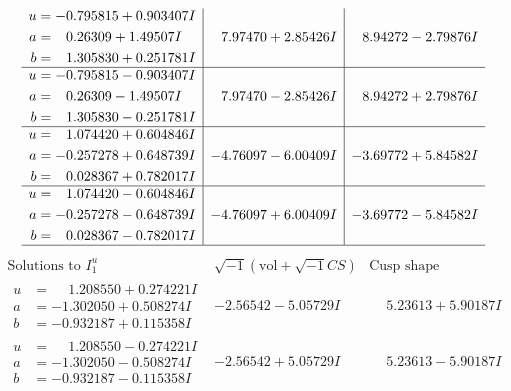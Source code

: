 \documentclass[1p]{elsarticle_modified}
\theoremstyle{definition}
\newcommand{\I}{\sqrt{-1}}
\begin{document}
$$\begin{array}{c|c|c}
\begin{aligned}
u &= -0.795815 + 0.903407 I \\
a &= \phantom{-}0.26309 + 1.49507 I \\
b &= \phantom{-}1.305830 + 0.251781 I\end{aligned}
 & \phantom{-}7.97470 + 2.85426 I & \phantom{-}8.94272 - 2.79876 I \\ \hline\begin{aligned}
u &= -0.795815 - 0.903407 I \\
a &= \phantom{-}0.26309 - 1.49507 I \\
b &= \phantom{-}1.305830 - 0.251781 I\end{aligned}
 & \phantom{-}7.97470 - 2.85426 I & \phantom{-}8.94272 + 2.79876 I \\ \hline\begin{aligned}
u &= \phantom{-}1.074420 + 0.604846 I \\
a &= -0.257278 + 0.648739 I \\
b &= \phantom{-}0.028367 + 0.782017 I\end{aligned}
 & -4.76097 - 6.00409 I & -3.69772 + 5.84582 I \\ \hline\begin{aligned}
u &= \phantom{-}1.074420 - 0.604846 I \\
a &= -0.257278 - 0.648739 I \\
b &= \phantom{-}0.028367 - 0.782017 I\end{aligned}
 & -4.76097 + 6.00409 I & -3.69772 - 5.84582 I\\
 \hline 
 \end{array}$$\newpage$$\begin{array}{c|c|c}  
\text{Solutions to }I^u_{1}& \I (\text{vol} + \sqrt{-1}CS) & \text{Cusp shape}\\
 \hline 
\begin{aligned}
u &= \phantom{-}1.208550 + 0.274221 I \\
a &= -1.302050 + 0.508274 I \\
b &= -0.932187 + 0.115358 I\end{aligned}
 & -2.56542 - 5.05729 I & \phantom{-}5.23613 + 5.90187 I \\ \hline\begin{aligned}
u &= \phantom{-}1.208550 - 0.274221 I \\
a &= -1.302050 - 0.508274 I \\
b &= -0.932187 - 0.115358 I\end{aligned}
 & -2.56542 + 5.05729 I & \phantom{-}5.23613 - 5.90187 I \\ \hline\begin{aligned}

\end{aligned}
\end{array}$$
\end{document}
